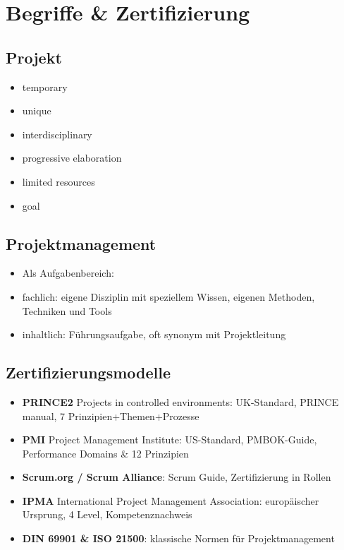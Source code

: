 \documentclass{article}
\author{Leopold Lemmermann}
\begin{document}
\createtitle
\section{Begriffe \& Zertifizierung}
\subsection{Projekt}
\begin{itemize}
  \item temporary
  \item unique
  \item interdisciplinary
  \item progressive elaboration
  \item limited resources
  \item goal
\end{itemize}

\subsection{Projektmanagement}
\begin{itemize}
  \item Als Aufgabenbereich: 
  \item fachlich: eigene Disziplin mit speziellem Wissen, eigenen Methoden, Techniken und Tools
  \item inhaltlich: Führungsaufgabe, oft synonym mit Projektleitung
\end{itemize}

\subsection{Zertifizierungsmodelle}
\begin{itemize}
  \item \textbf{PRINCE2} Projects in controlled environments: UK-Standard, PRINCE manual, 7 Prinzipien+Themen+Prozesse
  \item \textbf{PMI} Project Management Institute: US-Standard, PMBOK-Guide, Performance Domains \& 12 Prinzipien
  \item \textbf{Scrum.org / Scrum Alliance}: Scrum Guide, Zertifizierung in Rollen
  \item \textbf{IPMA} International Project Management Association: europäischer Ursprung, 4 Level, Kompetenznachweis
  \item \textbf{DIN 69901 \& ISO 21500}: klassische Normen für Projektmanagement
\end{itemize}
\end{document}
